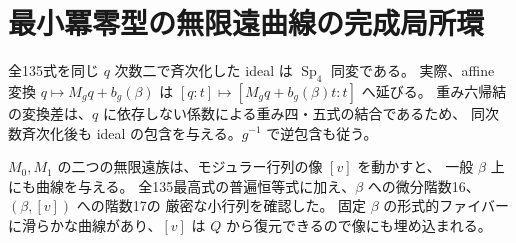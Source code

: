 \documentclass[11pt,a4paper]{ltjsarticle}
\DeclareMathOperator{\Sp}{Sp}
\theoremstyle{remark}
\begin{document}
\section{最小冪零型の無限遠曲線の完成局所環}
全135式を同じ $q$ 次数二で斉次化した ideal は $\Sp_4$ 同変である。
実際、affine 変換 $q\mapsto M_gq+b_g(\beta)$ は
$[q:t]\mapsto[M_gq+b_g(\beta)t:t]$ へ延びる。
重み六帰結の変換差は、$q$ に依存しない係数による重み四・五式の結合であるため、
同次数斉次化後も ideal の包含を与える。$g^{-1}$ で逆包含も従う\cite{homog-equiv-v34}。

$M_0,M_1$ の二つの無限遠族は、モジュラー行列の像 $[v]$ を動かすと、
一般 $\beta$ 上にも曲線を与える。
全135最高式の普遍恒等式に加え、$\beta$ への微分階数16、$(\beta,[v])$ への階数17の
厳密な小行列を確認した\cite{minimal-formal-v34}。
固定 $\beta$ の形式的ファイバーに滑らかな曲線があり、$[v]$ は $Q$ から復元できるので像にも埋め込まれる。
\end{document}
